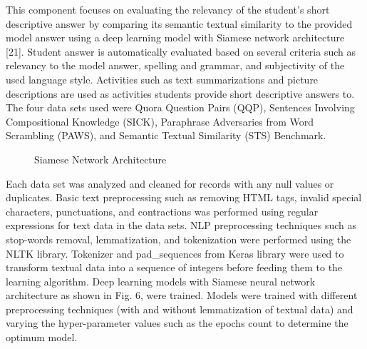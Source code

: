 \documentclass[conference]{IEEEtran}
\begin{document}
This component focuses on evaluating the relevancy of the student's short descriptive answer by comparing its semantic textual similarity to the provided model answer using a deep learning model with Siamese network architecture [21]. Student answer is automatically evaluated based on several criteria such as relevancy to the model answer, spelling and grammar, and subjectivity of the used language style. Activities such as text summarizations and picture descriptions are used as activities students provide short descriptive answers to. The four data sets used were Quora Question Pairs (QQP), Sentences Involving Compositional Knowledge (SICK), Paraphrase Adversaries from Word Scrambling (PAWS), and Semantic Textual Similarity (STS) Benchmark.

\begin{figure}[htbp]
\centerline{}
\caption{Siamese Network Architecture}
\end{figure}

Each data set was analyzed and cleaned for records with any null values or duplicates. Basic text preprocessing such as removing HTML tags, invalid special characters, punctuations, and contractions was performed using regular expressions for text data in the data sets. NLP preprocessing techniques such as stop-words removal, lemmatization, and tokenization were performed using the NLTK library. Tokenizer and pad\_sequences from Keras library were used to transform textual data into a sequence of integers before feeding them to the learning algorithm. Deep learning models with Siamese neural network architecture as shown in Fig. 6, were trained. Models were trained with different preprocessing techniques (with and without lemmatization of textual data) and varying the hyper-parameter values such as the epochs count to determine the optimum model.
\end{document}
